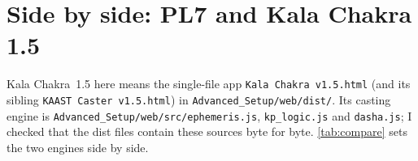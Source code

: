 \section{Side by side: PL7 and Kala Chakra 1.5}
\label{sec:compare}

Kala Chakra~1.5 here means the single-file app \texttt{Kala Chakra v1.5.html} (and its
sibling \texttt{KAAST Caster v1.5.html}) in \texttt{Advanced\_Setup/web/dist/}. Its casting
engine is \texttt{Advanced\_Setup/web/src/ephemeris.js}, \texttt{kp\_logic.js} and
\texttt{dasha.js}; I checked that the dist files contain these sources byte for byte.
\autoref{tab:compare} sets the two engines side by side.


